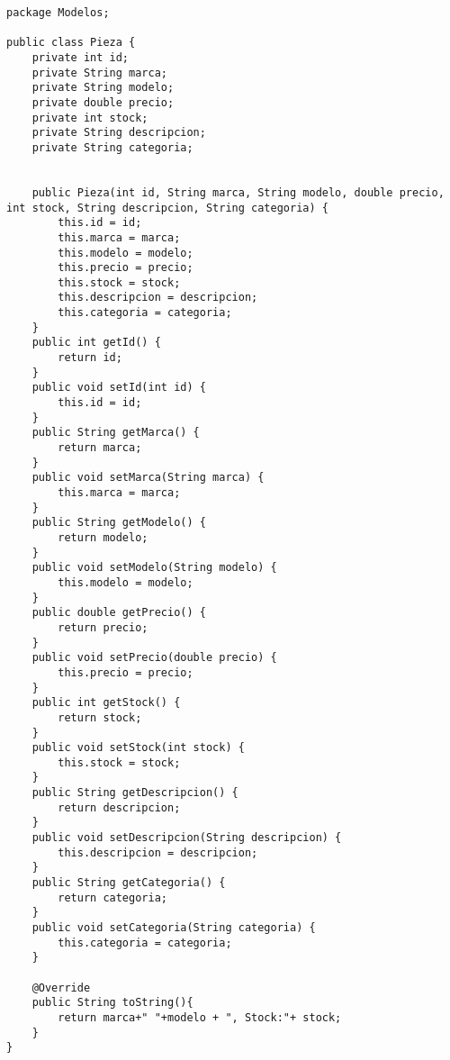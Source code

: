 \clearpage


\begin{lstlisting}[caption=Pieza.java (App Escritorio)]
package Modelos;

public class Pieza {
	private int id;
	private String marca;
	private String modelo;
	private double precio;
	private int stock;
	private String descripcion;
	private String categoria;
	
	
	public Pieza(int id, String marca, String modelo, double precio, int stock, String descripcion, String categoria) {
		this.id = id;
		this.marca = marca;
		this.modelo = modelo;
		this.precio = precio;
		this.stock = stock;
		this.descripcion = descripcion;
		this.categoria = categoria;
	}
	public int getId() {
		return id;
	}
	public void setId(int id) {
		this.id = id;
	}
	public String getMarca() {
		return marca;
	}
	public void setMarca(String marca) {
		this.marca = marca;
	}
	public String getModelo() {
		return modelo;
	}
	public void setModelo(String modelo) {
		this.modelo = modelo;
	}
	public double getPrecio() {
		return precio;
	}
	public void setPrecio(double precio) {
		this.precio = precio;
	}
	public int getStock() {
		return stock;
	}
	public void setStock(int stock) {
		this.stock = stock;
	}
	public String getDescripcion() {
		return descripcion;
	}
	public void setDescripcion(String descripcion) {
		this.descripcion = descripcion;
	}
	public String getCategoria() {
		return categoria;
	}
	public void setCategoria(String categoria) {
		this.categoria = categoria;
	}
	
	@Override
	public String toString(){
		return marca+" "+modelo + ", Stock:"+ stock;
	}
}
\end{lstlisting}

\clearpage

